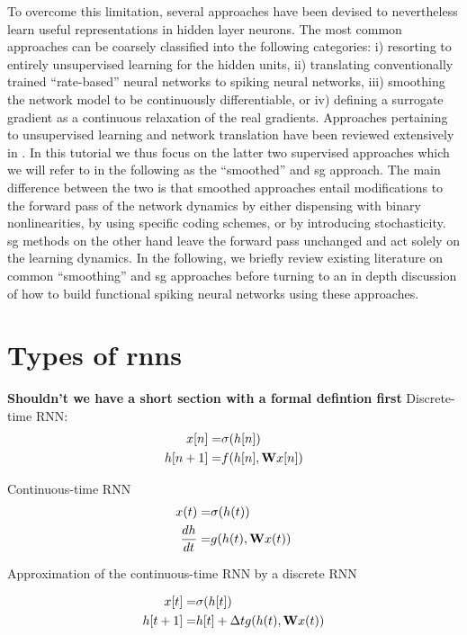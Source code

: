 \documentclass[journal,onecolumn,11pt]{IEEEtran}
\begin{document}
To overcome this limitation, several approaches have been devised to nevertheless
learn useful representations in hidden layer neurons.
The most common approaches can be coarsely classified into the following
categories: 
i) resorting to entirely unsupervised learning for the
hidden units, 
ii) translating conventionally trained ``rate-based'' neural networks to spiking
neural networks,
iii) smoothing the network model to be continuously differentiable, or 
iv) defining a surrogate gradient as a continuous relaxation of the real
gradients.  
Approaches pertaining to unsupervised learning and network translation have been
reviewed extensively in \cite{tavanaei_deep_2018}. 
In this tutorial we thus focus on the latter two supervised approaches which we will
refer to in the following as the ``smoothed'' and \gls{sg} approach.
The main difference between the two is that smoothed approaches entail
modifications to the forward pass of the network dynamics by either dispensing
with binary nonlinearities, by using specific coding schemes, 
or by introducing stochasticity.  \Gls{sg} methods on the other hand
leave the forward pass unchanged and act solely on the learning dynamics. 
In the following, we briefly review existing literature on common ``smoothing''
and \gls{sg} approaches
before turning to an in depth discussion of how to build functional spiking neural 
networks using these approaches. 

\section{Types of \glspl{rnn}}
{\bf Shouldn't we have a short section with a formal defintion first}
Discrete-time RNN:
\begin{align}
x[n] = & \sigma(h[n]) \\
h[n+1] = & f(h[n],{\bf W}x[n])
\end{align}

Continuous-time RNN
\begin{align}
x(t) = & \sigma(h(t)) \\
\frac{dh}{dt} = &g(h(t),{\bf W}x(t))
\end{align}

Approximation of the continuous-time RNN by a discrete RNN

\[
\begin{split}
x[t] = & \sigma(h[t]) \\
h[t+1] = & h[t] + \Delta t g(h(t),{\bf W}x(t))
\end{split}
\]
\end{document}
